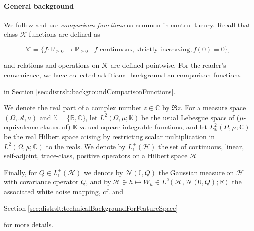\documentclass[letterpaper]{article} %
\newcommand{\R}{\mathbb{R}}
\newcommand{\Rnn}{\R_{\geq 0}}
\newcommand{\setsys}[1]{\mathcal{#1}}
\newcommand{\hs}[1]{\mathcal{#1}} %
\newcommand{\cK}{\mathcal{K}} %
\newcommand{\Normal}{\mathcal{N}}
\newcommand{\C}{\mathbb{C}}
\newcommand{\K}{\mathbb{K}} %
\newcommand{\defm}[1]{\emph{#1}}
\newif\ifTwoColumns
\newif\ifCameraReady
\begin{document}
\paragraph{General background}
We follow \cite{fiedler2024statistical} and use \defm{comparison functions} as common in control theory.
Recall that class $\cK$ functions are defined as
\ifTwoColumns
$\cK=\{f:\Rnn\rightarrow\Rnn \mid f \text{ continuous, strictly increasing}, f(0)=0 \}$,
\else
\begin{equation*}
    \cK=\{f:\Rnn\rightarrow\Rnn \mid f \text{ continuous, strictly increasing}, f(0)=0 \},
\end{equation*}
\fi
and relations and operations on $\cK$ are defined pointwise.
For the reader's convenience, we have collected additional background on comparison functions 
\ifCameraReady
in the supplementary material.
\else
in Section \ref{sec:distrslt:backgroundComparisonFunctions}.
\fi

We denote the real part of a complex number $z\in\C$ by $\Re z$.
For a measure space $(\Omega,\setsys{A},\mu)$ and $\K=\{\R,\C\}$, let $L^2(\Omega,\mu;\K)$ be the usual Lebesgue space of ($\mu$-equivalence classes of) $\K$-valued square-integrable functions, and let $L^2_\R(\Omega,\mu;\C)$ be the real Hilbert space arising by restricting scalar multiplication in $L^2(\Omega,\mu;\C)$ to the reals.
We denote by $L_1^+(\hs{H})$ the set of continuous, linear, self-adjoint, trace-class, positive operators on a Hilbert space $\hs{H}$.

Finally, for $Q\in L_1^+(\hs{H})$ we denote by $\Normal(0,Q)$ the Gaussian measure on $\hs{H}$ with covariance operator $Q$,
and by $\hs{H} \ni h \mapsto W_h \in L^2(\hs{H},\Normal(0,Q);\R)$ the associated white noise mapping, cf. \cite{daprato2002second} and 
\ifCameraReady
the supplementary material
\else
Section \ref{sec:distrslt:technicalBackgroundForFeatureSpace}
\fi
for more details.
\end{document}
